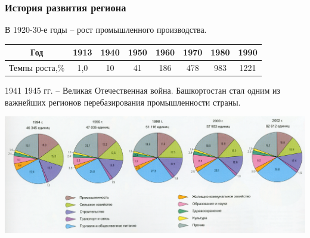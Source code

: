 \begin{frame}
\frametitle{История развития региона}

В 1920-30-е годы -- рост промышленного производства. 
\begin{center}
\begin{tabular}{|c|c|c|c|c|c|c|c|}
\hline 
Год & 1913 & 1940 & 1950 & 1960 & 1970 & 1980 & 1990 \\ 
\hline 
Темпы роста,\% & 1,0 & 10 & 41 & 186 & 478 & 983 & 1221 \\ 
\hline 
\end{tabular} 
\end{center}

1941 1945 гг. – Великая Отечественная война. Башкортостан стал одним из важнейших регионов перебазирования промышленности страны.

\includegraphics[width=1\linewidth]{pics/sasha/industries}

\end{frame}

